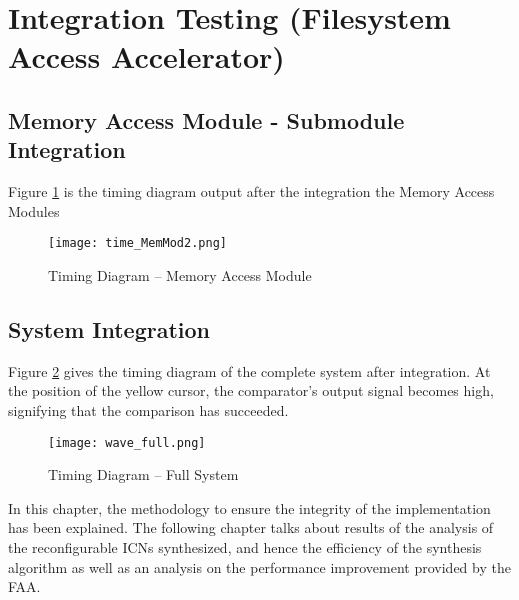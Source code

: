 \section{Integration Testing (Filesystem Access Accelerator)}

\subsection{Memory Access Module - Submodule Integration}

Figure \ref{fig:time_MemMod} is the timing diagram output after the integration the Memory Access Modules

\begin{figure}[!ht]
	\centering
	\texttt{[image: time\_MemMod2.png]}
	\caption{ Timing Diagram -- Memory Access Module}
	\label{fig:time_MemMod}
\end{figure}

\subsection{ System Integration }
    Figure \ref{fig:wave_full} gives the timing diagram of the complete system after integration. At the position of the yellow cursor, the comparator's output signal becomes high, signifying that the comparison has succeeded.

\begin{figure}[!ht]
	\centering
	\texttt{[image: wave\_full.png]}
	\caption{ Timing Diagram -- Full System}
	\label{fig:wave_full}
\end{figure}



In this chapter, the methodology to ensure the integrity of the implementation has been explained. The following chapter talks about results of the analysis of the reconfigurable ICNs synthesized, and hence the efficiency of the synthesis algorithm as well as an analysis on the performance improvement provided by the FAA.

